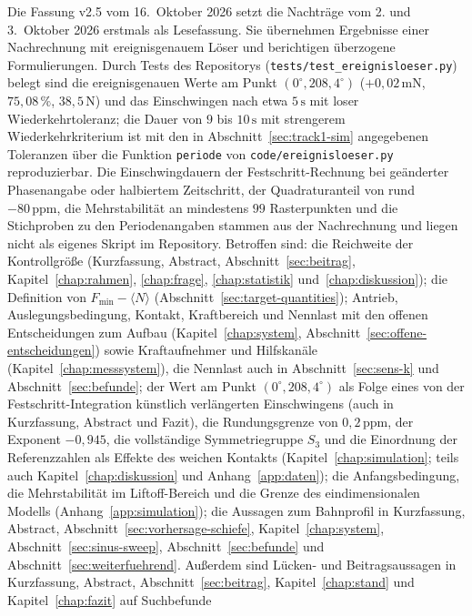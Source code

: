 \documentclass[12pt,a4paper]{report}
\begin{document}
Die Fassung v2.5 vom 16.~Oktober 2026 setzt die Nachträge vom 2. und
3.~Oktober 2026 erstmals als Lesefassung. Sie
übernehmen Ergebnisse einer Nachrechnung mit ereignisgenauem Löser und
berichtigen überzogene Formulierungen. Durch Tests des Repositorys
(\texttt{tests/test\_ereignisloeser.py}) belegt sind die ereignisgenauen
Werte am Punkt $(0^\circ, 208{,}4^\circ)$ ($+0{,}02\,\mathrm{mN}$,
$75{,}08\,\%$, $38{,}5\,\mathrm{N}$) und das Einschwingen nach etwa
$5\,\mathrm{s}$ mit loser Wiederkehrtoleranz; die Dauer von $9$ bis
$10\,\mathrm{s}$ mit strengerem Wiederkehrkriterium ist mit den in
Abschnitt~\ref{sec:track1-sim} angegebenen Toleranzen über die Funktion
\texttt{periode} von \texttt{code/ereignisloeser.py} reproduzierbar. Die
Einschwingdauern der Festschritt-Rechnung bei geänderter Phasenangabe
oder halbiertem Zeitschritt, der Quadraturanteil von rund
$-80\,\mathrm{ppm}$, die
Mehrstabilität an mindestens $99$ Rasterpunkten und die Stichproben zu
den Periodenangaben stammen aus der Nachrechnung und liegen nicht als
eigenes Skript im Repository. Betroffen sind: die Reichweite der
Kontrollgröße (Kurzfassung, Abstract, Abschnitt~\ref{sec:beitrag},
Kapitel~\ref{chap:rahmen}, \ref{chap:frage}, \ref{chap:statistik}
und~\ref{chap:diskussion}); die Definition von
$F_{\min} - \langle N \rangle$ (Abschnitt~\ref{sec:target-quantities});
Antrieb, Auslegungsbedingung, Kontakt, Kraftbereich und Nennlast mit den
offenen Entscheidungen zum Aufbau (Kapitel~\ref{chap:system},
Abschnitt~\ref{sec:offene-entscheidungen}) sowie Kraftaufnehmer und
Hilfskanäle (Kapitel~\ref{chap:messsystem}), die Nennlast auch in
Abschnitt~\ref{sec:sens-k} und Abschnitt~\ref{sec:befunde}; der Wert am Punkt
$(0^\circ, 208{,}4^\circ)$ als Folge eines von der Festschritt-Integration
künstlich verlängerten Einschwingens (auch in Kurzfassung, Abstract und
Fazit), die
Rundungsgrenze von $0{,}2\,\mathrm{ppm}$, der Exponent $-0{,}945$, die
vollständige Symmetriegruppe $S_3$ und die Einordnung der Referenzzahlen
als Effekte des weichen Kontakts (Kapitel~\ref{chap:simulation}; teils
auch Kapitel~\ref{chap:diskussion} und Anhang~\ref{app:daten}); die
Anfangsbedingung, die Mehrstabilität im Liftoff-Bereich und die Grenze des
eindimensionalen Modells (Anhang~\ref{app:simulation}); die Aussagen zum
Bahnprofil in Kurzfassung, Abstract, Abschnitt~\ref{sec:vorhersage-schiefe},
Kapitel~\ref{chap:system}, Abschnitt~\ref{sec:sinus-sweep},
Abschnitt~\ref{sec:befunde} und Abschnitt~\ref{sec:weiterfuehrend}.
Außerdem sind Lücken- und Beitragsaussagen
in Kurzfassung, Abstract, Abschnitt~\ref{sec:beitrag},
Kapitel~\ref{chap:stand} und Kapitel~\ref{chap:fazit} auf Suchbefunde
\end{document}
